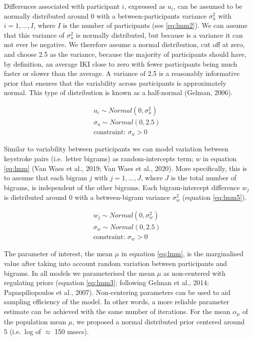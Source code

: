 \documentclass[
  english,
  man,mask,floatsintext]{apa7}
\begin{document}
Differences associated with participant \(i\), expressed as \(u_i\), can be assumed to be normally distributed around 0 with a between-participants variance \(\sigma_u^2\) with \(i = 1, \dots, I\), where \(I\) is the number of participants (see \ref{eq:lmm2}). We can assume that this variance of \(\sigma_u^2\) is normally distributed, but because is a variance it can not ever be negative. We therefore assume a normal distribution, cut off at zero, and choose 2.5 as the variance, because the majority of participants should have, by definition, an average IKI close to zero with fewer participants being much faster or slower than the average. A variance of 2.5 is a reasonably informative prior that ensures that the variability across participants is approximately normal. This type of distribution is known as a half-normal (Gelman, 2006).

\[
\tag{2}
\begin{aligned}
u_i \sim Normal(0,\sigma_u^2)\\
\sigma_u \sim Normal(0,2.5)\\
\text{constraint: } \sigma_u >0 
\end{aligned}
\label{eq:lmm2}
\]

Similar to variability between participants we can model variation between keystroke pairs (i.e.~letter bigrams) as random-intercepts term; \(w\) in equation \ref{eq:lmm} (Van Waes et al., 2019; Van Waes et al., 2020). More specifically, this is to assume that each bigram \(j\) with \(j = 1, \dots, J\), where \(J\) is the total number of bigrams, is independent of the other bigrams. Each bigram-intercept difference \(w_j\) is distributed around 0 with a between-bigram variance \(\sigma_w^2\) (equation \ref{eq:lmm5}).

\[
\tag{3}
\begin{aligned}
w_j \sim Normal(0,\sigma_w^2)\\
\sigma_w \sim Normal(0,2.5)\\
\text{constraint: }\sigma_w >0 
\end{aligned}
\label{eq:lmm5}
\]

The parameter of interest, the mean \(\mu\) in equation \ref{eq:lmm}, is the marginalised value after taking into account random variation between participants and bigrams. In all models we parameterised the mean \(\mu\) as non-centered with regulating priors (equation \ref{eq:lmm3}; following Gelman et al., 2014; Papaspiliopoulos et al., 2007). Non-centering parameters can be used to aid sampling efficiency of the model. In other words, a more reliable parameter estimate can be achieved with the same number of iterations. For the mean \(\alpha_\mu\) of the population mean \(\mu\), we proposed a normal distributed prior centered around 5 (i.e.~log of \(\approx\) 150 msecs).
\end{document}
